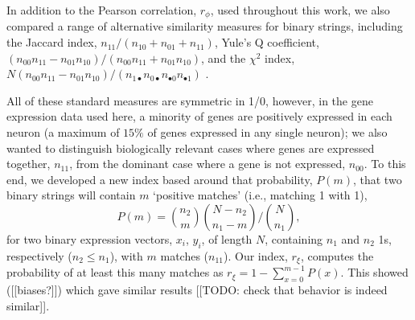 \documentclass[10pt,letterpaper]{article}
\begin{document}
In addition to the Pearson correlation, $r_\phi$, used throughout this work, we also compared a range of alternative similarity measures for binary strings, including the
Jaccard index, $n_{11}/(n_{10}+n_{01}+n_{11})$,
Yule's Q coefficient, $(n_{00}n_{11} - n_{01}n_{10})/(n_{00}n_{11} + n_{01}n_{10})$,
and the $\chi^2$ index, $N (n_{00}n_{11} - n_{01}n_{10})/(n_{1\bullet}n_{0\bullet}n_{\bullet 0}n_{\bullet 1})$ \cite{Kaufman2006}.

All of these standard measures are symmetric in 1/0, however, in the gene expression data used here, a minority of genes are positively expressed in each neuron (a maximum of $15\%$ of genes expressed in any single neuron); we also wanted to distinguish biologically relevant cases where genes are expressed together, $n_{11}$, from the dominant case where a gene is not expressed, $n_{00}$.
To this end, we developed a new index based around that probability, $P(m)$, that two binary strings will contain $m$ `positive matches' (i.e., matching 1 with 1),
\begin{equation}
    P(m) = \binom{n_2}{m} \binom{N-n_2}{n_1-m} / \binom{N}{n_1},
\end{equation}
for two binary expression vectors, $x_i$, $y_i$, of length $N$, containing $n_1$ and $n_2$ 1s, respectively ($n_2 \leq n_1$), with $m$ matches ($n_{11}$).
Our index, $r_\xi$, computes the probability of at least this many matches as $r_\xi = 1 - \sum_{x=0}^{m-1} P(x)$.
This showed ([[biases?]]) which gave similar results [[TODO: check that behavior is indeed similar]].
\end{document}
